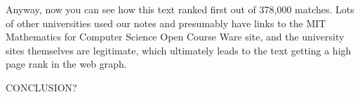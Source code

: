 \begin{editingnotes}

\end{editingnotes}

Anyway, now you can see how this text ranked first out of 378,000
matches.  Lots of other universities used our notes and presumably
have links to the MIT Mathematics for Computer Science Open Course
Ware site, and the university sites themselves are legitimate, which
ultimately leads to the text getting a high page rank in the web
graph.

\begin{problems}
\practiceproblems
{}

\classproblems
{}

\homeworkproblems
{}

\examproblems
{}

\end{problems}
\begin{editingnotes}
CONCLUSION?
\end{editingnotes}
\endinput
